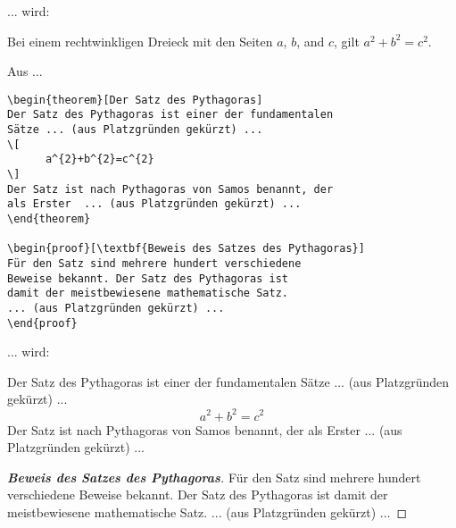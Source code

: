 ... wird:

\begin{tcolorbox}[width=\textwidth,colback={light-gray},title={Print-Text},colbacktitle=gray,coltitle=white]

\begin{theorem} 
Bei einem rechtwinkligen Dreieck mit den Seiten $a$, $b$, 
and $c$, gilt $a^2+b^2=c^2$.
\end{theorem}

\end{tcolorbox}



\pagebreak 
Aus ...

\begin{tcolorbox}[width=\textwidth,colback={light-gray},title={Latex-Text},colbacktitle=gray,coltitle=white]

\begin{verbatim}
\begin{theorem}[Der Satz des Pythagoras] 
Der Satz des Pythagoras ist einer der fundamentalen 
Sätze ... (aus Platzgründen gekürzt) ... 
\[
      a^{2}+b^{2}=c^{2}
\]
Der Satz ist nach Pythagoras von Samos benannt, der 
als Erster  ... (aus Platzgründen gekürzt) ...
\end{theorem}

\begin{proof}[\textbf{Beweis des Satzes des Pythagoras}]
Für den Satz sind mehrere hundert verschiedene 
Beweise bekannt. Der Satz des Pythagoras ist 
damit der meistbewiesene mathematische Satz.  
... (aus Platzgründen gekürzt) ... 
\end{proof}
\end{verbatim}

\end{tcolorbox}

... wird:

\begin{tcolorbox}[width=\textwidth,colback={light-gray},title={Print-Text},colbacktitle=gray,coltitle=white]

\begin{theorem} 
Der Satz des Pythagoras ist einer der fundamentalen 
Sätze ... (aus Platzgründen gekürzt) ... 
\[
      a^{2}+b^{2}=c^{2}
\]
Der Satz ist nach Pythagoras von Samos benannt, der 
als Erster  ... (aus Platzgründen gekürzt) ...
\end{theorem}

\begin{proof}[\textbf{Beweis des Satzes des Pythagoras}]
Für den Satz sind mehrere hundert verschiedene 
Beweise bekannt. Der Satz des Pythagoras ist 
damit der meistbewiesene mathematische Satz.  
... (aus Platzgründen gekürzt) ... 
\end{proof}

\end{tcolorbox}

